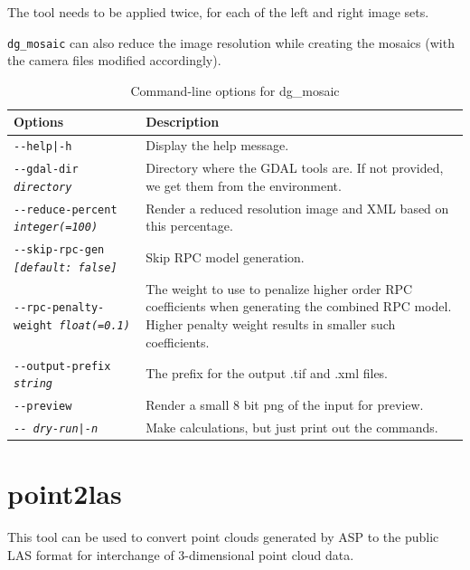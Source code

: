 The tool needs to be applied twice, for each of the left and right image sets.

\texttt{dg\_mosaic} can also reduce the image resolution while creating the
mosaics (with the camera files modified accordingly).


\begin{longtable}{|l|p{10cm}|}
\caption{Command-line options for dg\_mosaic}
\label{tbl:dgmosaic}
\endfirsthead
\endhead
\endfoot
\endlastfoot
\hline
Options & Description \\ \hline \hline
\texttt{-\/-help|-h} & Display the help message.\\ \hline
\texttt{-\/-gdal-dir \textit{directory}} &
Directory where the GDAL tools are. If not provided, we get them from the environment. \\ \hline
\texttt{-\/-reduce-percent \textit{integer(=100)}} &
Render a reduced resolution image and XML based on this percentage. \\ \hline
\texttt{-\/-skip-rpc-gen \textit{[default: false]}} &
Skip RPC model generation.\\ \hline
\texttt{-\/-rpc-penalty-weight \textit{float(=0.1)}} &
The weight to use to penalize higher order RPC coefficients when generating the combined RPC model. Higher penalty weight results in smaller such coefficients.\\ \hline
\texttt{-\/-output-prefix \textit{string}} & The prefix for the output .tif and .xml files. \\ \hline

\texttt{-\/-preview } & Render a small 8 bit png of the input for preview. \\ \hline
\texttt{-\/- \textit{dry-run|-n}} & Make calculations, but just print out the commands. \\ \hline
\end{longtable}

\section{point2las}
\label{point2las}

This tool can be used to convert point clouds generated by ASP to the
public LAS format for interchange of 3-dimensional point cloud data.

